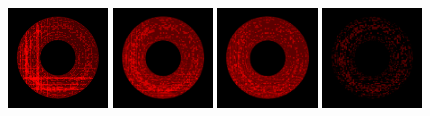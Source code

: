 \begin{figure}[!htb]
  \centering
  \includegraphics[height=100px]{images/graphics/overdraw-torus1-nocull.png}
  \includegraphics[height=100px]{images/graphics/overdraw-torus1-pooc.png}
  \includegraphics[height=100px]{images/graphics/overdraw-torus1-pmoc.png}
  \includegraphics[height=100px]{images/graphics/overdraw-torus1-diff.png}


\end{figure}
